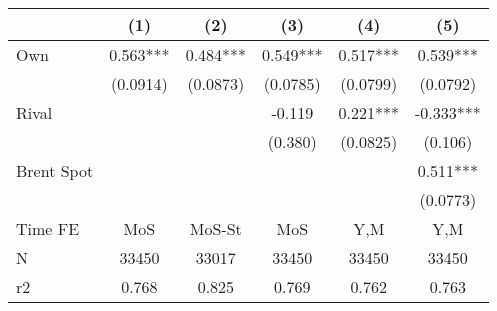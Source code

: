 {
\def\sym#1{\ifmmode^{#1}\else\(^{#1}\)\fi}
\begin{tabular}{l*{5}{c}}
\toprule
                &\multicolumn{1}{c}{(1)}   &\multicolumn{1}{c}{(2)}   &\multicolumn{1}{c}{(3)}   &\multicolumn{1}{c}{(4)}   &\multicolumn{1}{c}{(5)}   \\
\midrule
Own             &    0.563***&    0.484***&    0.549***&    0.517***&    0.539***\\
                & (0.0914)   & (0.0873)   & (0.0785)   & (0.0799)   & (0.0792)   \\
\addlinespace
Rival           &            &            &   -0.119   &    0.221***&   -0.333***\\
                &            &            &  (0.380)   & (0.0825)   &  (0.106)   \\
\addlinespace
Brent Spot      &            &            &            &            &    0.511***\\
                &            &            &            &            & (0.0773)   \\
\midrule
Time FE         &      MoS   &   MoS-St   &      MoS   &      Y,M   &      Y,M   \\
N               &    33450   &    33017   &    33450   &    33450   &    33450   \\
r2              &    0.768   &    0.825   &    0.769   &    0.762   &    0.763   \\
\bottomrule
\end{tabular}
}
